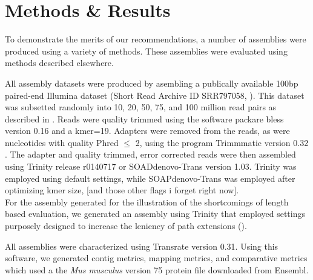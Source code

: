 \section*{Methods & Results}

To demonstrate the merits of our recommendations, a number of assemblies were produced using a variety of methods. These assemblies were evaluated using methods described elsewhere. 

All assembly datasets were produced by asembling a publically available 100bp paired-end Illumina dataset (Short Read Archive ID SRR797058, \citep{Macfarlan:2012js}). This dataset was subsetted randomly into 10, 20, 50, 75, and 100 million read pairs as described in \citep{MacManes:2014io}. Reads were quality trimmed using the software packare bless version 0.16 \citep{Heo:2014cb} and a kmer=19.  Adapters were removed from the reads, as were nucleotides with quality Phred $\leq$ 2, using the program Trimmmatic version 0.32 \citep{Bolger:2014ek}. The adapter and quality trimmed, error corrected reads were then assembled using Trinity release r0140717 or SOADdenovo-Trans version 1.03. Trinity was employed using default settings, while SOAPdenovo-Trans was employed after optimizing kmer size, [and those other flags i forget right now]. \\

For the assembly generated for the illustration of the shortcomings of length based evaluation, we generated an assembly using Trinity that employed settings purposely designed to increase the leniency of path extensions (). 

All assemblies were characterized using Transrate version 0.31. Using this software, we generated contig metrics, mapping metrics, and comparative metrics which used a the \textit{Mus musculus} version 75 protein file downloaded from Ensembl.   